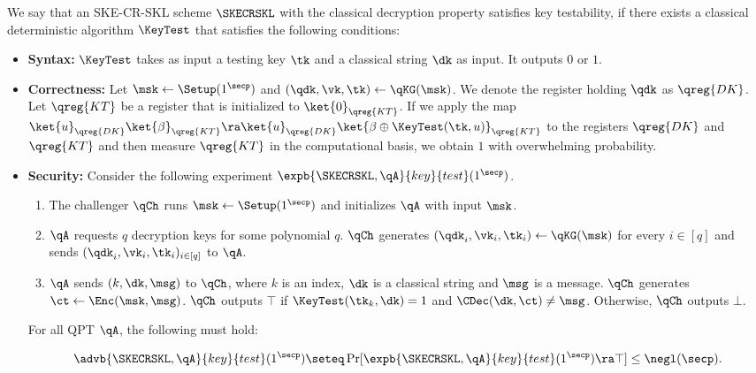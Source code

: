 \begin{definition}
We say that an SKE-CR-SKL scheme $\SKECRSKL$ with the classical
decryption property satisfies key testability, if there exists a
classical deterministic algorithm $\KeyTest$ that satisfies the
following conditions:

\begin{itemize}
\item \textbf{Syntax:} $\KeyTest$ takes as input a testing key $\tk$
and a classical string $\dk$ as input. It outputs $0$ or $1$.

\item \textbf{Correctness:} Let $\msk\gets\Setup(1^\secp)$ and
$(\qdk,\vk,\tk)\gets\qKG(\msk)$. We denote the register holding
$\qdk$ as $\qreg{DK}$. Let $\qreg{KT}$ be a register that is
initialized to $\ket{0}_{\qreg{KT}}$. If we apply the map
$\ket{u}_{\qreg{DK}}\ket{\beta}_{\qreg{KT}}\ra\ket{u}_{\qreg{DK}}\ket{\beta\oplus\KeyTest(\tk,u)}_{\qreg{KT}}$
to the registers $\qreg{DK}$ and $\qreg{KT}$ and then measure
$\qreg{KT}$ in the computational basis, we obtain $1$ with
overwhelming probability.

\item \textbf{Security:} Consider the following experiment
$\expb{\SKECRSKL,\qA}{key}{test}(1^\secp)$.

\begin{enumerate}
\item The challenger $\qCh$ runs $\msk\gets\Setup(1^\secp)$ and
initializes $\qA$ with input $\msk$. 

\item $\qA$ requests $q$ decryption keys for some polynomial $q$.
$\qCh$ generates $(\qdk_i,\vk_i,\tk_i)\gets\qKG(\msk)$
for every $i\in[q]$ and sends $(\qdk_i,\vk_i,\tk_i)_{i\in[q]}$ to
$\qA$.

\item $\qA$ sends $(k, \dk, \msg)$ to $\qCh$, where $k$ is
an index, $\dk$ is a classical string and $\msg$ is a message.
$\qCh$ generates $\ct\gets\Enc(\msk,\msg)$. $\qCh$ outputs $\top$ if
$\KeyTest(\tk_k,\dk)=1$ and $\CDec(\dk,\ct)\ne\msg$.
Otherwise, $\qCh$ outputs $\bot$.
\end{enumerate}

For all QPT $\qA$, the following must hold:

\begin{align}
\advb{\SKECRSKL,\qA}{key}{test}(1^\secp) \seteq
\Pr[\expb{\SKECRSKL,\qA}{key}{test}(1^\secp) \ra \top] \le
\negl(\secp).
\end{align} 
\end{itemize}
\end{definition}

